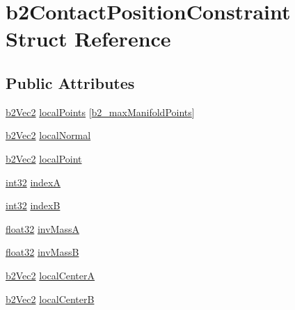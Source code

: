 \hypertarget{structb2_contact_position_constraint}{}\section{b2\+Contact\+Position\+Constraint Struct Reference}
\label{structb2_contact_position_constraint}
\subsection*{Public Attributes}
\begin{DoxyCompactItemize}
\item 
\mbox{\hyperlink{structb2_vec2}{b2\+Vec2}} \mbox{\hyperlink{structb2_contact_position_constraint_a926e69accc91aeb346176f12cc33116c}{local\+Points}} \mbox{[}\mbox{\hyperlink{b2_settings_8h_aa5f44cc9edf711433dea2b2ec94f3c42}{b2\+\_\+max\+Manifold\+Points}}\mbox{]}
\item 
\mbox{\hyperlink{structb2_vec2}{b2\+Vec2}} \mbox{\hyperlink{structb2_contact_position_constraint_a34e0ee4de75f5d08725f159fa969e02a}{local\+Normal}}
\item 
\mbox{\hyperlink{structb2_vec2}{b2\+Vec2}} \mbox{\hyperlink{structb2_contact_position_constraint_aa5984e40b01a6f06a6698d79d727a14e}{local\+Point}}
\item 
\mbox{\hyperlink{b2_settings_8h_a43d43196463bde49cb067f5c20ab8481}{int32}} \mbox{\hyperlink{structb2_contact_position_constraint_aafc38d3d582370dd5ac476646ba6a4fa}{indexA}}
\item 
\mbox{\hyperlink{b2_settings_8h_a43d43196463bde49cb067f5c20ab8481}{int32}} \mbox{\hyperlink{structb2_contact_position_constraint_a81752f3923bf4e4fe27d58f3add0fbdb}{indexB}}
\item 
\mbox{\hyperlink{b2_settings_8h_aacdc525d6f7bddb3ae95d5c311bd06a1}{float32}} \mbox{\hyperlink{structb2_contact_position_constraint_a63b1e39720ddd9d6af863cbe8ea9008a}{inv\+MassA}}
\item 
\mbox{\hyperlink{b2_settings_8h_aacdc525d6f7bddb3ae95d5c311bd06a1}{float32}} \mbox{\hyperlink{structb2_contact_position_constraint_af47ccd76270c1acd6ae18685ab87ae36}{inv\+MassB}}
\item 
\mbox{\hyperlink{structb2_vec2}{b2\+Vec2}} \mbox{\hyperlink{structb2_contact_position_constraint_a3c0ff098c54e3c3bfed4470c4f62c4ee}{local\+CenterA}}
\item 
\mbox{\hyperlink{structb2_vec2}{b2\+Vec2}} \mbox{\hyperlink{structb2_contact_position_constraint_acf14c9cfcf37ae1c89d0e4bc6c2d3ac2}{local\+CenterB}}

\end{DoxyCompactItemize}
